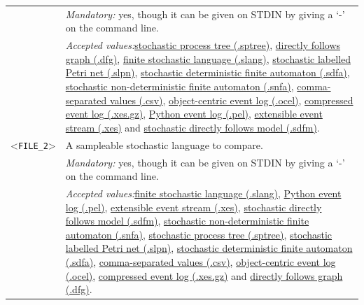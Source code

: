 {\begin{tabularx}{\linewidth}{lX}
&\textit{Mandatory:} \quad yes, though it can be given on STDIN by giving a `-' on the command line.\\
&\textit{Accepted values:}\quad \hyperref[filehandler:stochastic process tree]{stochastic process tree (.sptree)}, \hyperref[filehandler:directly follows graph]{directly follows graph (.dfg)}, \hyperref[filehandler:finite stochastic language]{finite stochastic language (.slang)}, \hyperref[filehandler:stochastic labelled Petri net]{stochastic labelled Petri net (.slpn)}, \hyperref[filehandler:stochastic deterministic finite automaton]{stochastic deterministic finite automaton (.sdfa)}, \hyperref[filehandler:stochastic non-deterministic finite automaton]{stochastic non-deterministic finite automaton (.snfa)}, \hyperref[filehandler:comma-separated values]{comma-separated values (.csv)}, \hyperref[filehandler:object-centric event log]{object-centric event log (.ocel)}, \hyperref[filehandler:compressed event log]{compressed event log (.xes.gz)}, \hyperref[filehandler:Python event log]{Python event log (.pel)}, \hyperref[filehandler:extensible event stream]{extensible event stream (.xes)} and \hyperref[filehandler:stochastic directly follows model]{stochastic directly follows model (.sdfm)}.\\
<\texttt{FILE\_2}>&A sampleable stochastic language to compare.\\
&\textit{Mandatory:} \quad yes, though it can be given on STDIN by giving a `-' on the command line.\\
&\textit{Accepted values:}\quad \hyperref[filehandler:finite stochastic language]{finite stochastic language (.slang)}, \hyperref[filehandler:Python event log]{Python event log (.pel)}, \hyperref[filehandler:extensible event stream]{extensible event stream (.xes)}, \hyperref[filehandler:stochastic directly follows model]{stochastic directly follows model (.sdfm)}, \hyperref[filehandler:stochastic non-deterministic finite automaton]{stochastic non-deterministic finite automaton (.snfa)}, \hyperref[filehandler:stochastic process tree]{stochastic process tree (.sptree)}, \hyperref[filehandler:stochastic labelled Petri net]{stochastic labelled Petri net (.slpn)}, \hyperref[filehandler:stochastic deterministic finite automaton]{stochastic deterministic finite automaton (.sdfa)}, \hyperref[filehandler:comma-separated values]{comma-separated values (.csv)}, \hyperref[filehandler:object-centric event log]{object-centric event log (.ocel)}, \hyperref[filehandler:compressed event log]{compressed event log (.xes.gz)} and \hyperref[filehandler:directly follows graph]{directly follows graph (.dfg)}.\\

\end{tabularx}}
